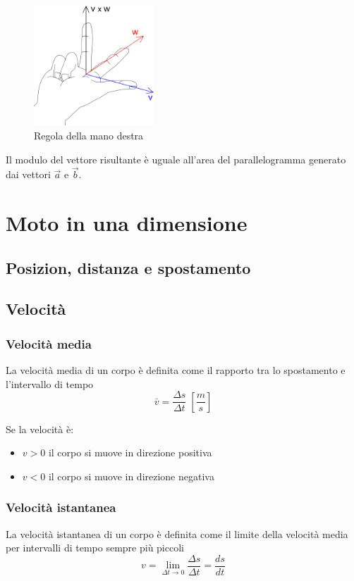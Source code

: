 \documentclass[a4paper]{article}
\theoremstyle{break}
\theoremstyle{break}
\theoremstyle{break}
\theoremstyle{break}
\begin{document}
\begin{figure}[H]
	\centering
	\includegraphics[width=0.4\textwidth]{manoDestra}
	\caption{Regola della mano destra}
\end{figure}

\noindent Il modulo del vettore risultante è uguale all'area del parallelogramma generato dai vettori \( \vec{a} \) e \( \vec{b} \).

\section{Moto in una dimensione}
\subsection{Posizion, distanza e spostamento}

\subsection{Velocità}
\subsubsection{Velocità media}
\begin{definition}
	La velocità media di un corpo è definita come il rapporto tra lo spostamento e l'intervallo di tempo
	\[
		\bar{v} = \frac{\Delta s}{\Delta t} \; \left[ \frac{m}{s} \right]
	\]
\end{definition}

Se la velocità è:
\begin{itemize}
	\item \( v > 0 \) il corpo si muove in direzione positiva
	\item \( v < 0 \) il corpo si muove in direzione negativa
\end{itemize}

\subsubsection{Velocità istantanea}
\begin{definition}
	La velocità istantanea di un corpo è definita come il limite della velocità media
	per intervalli di tempo sempre più piccoli
	\[
		v = \lim_{\Delta t \to 0} \frac{\Delta s}{\Delta t} = \frac{ds}{dt}
	\]
\end{definition}
\end{document}
